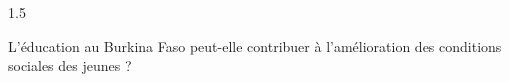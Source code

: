 \documentclass[12pt]{article}
\begin{document}
\begin{spacing}{1.5}

L'éducation au Burkina Faso peut-elle contribuer à l'amélioration des conditions sociales des jeunes ?


\quad
\quad

\end{spacing}
\end{document}
